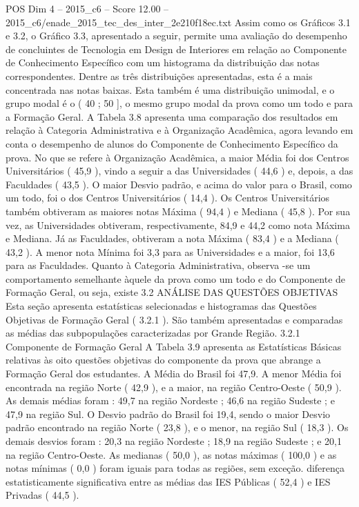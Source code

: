 \begin{textsample}{POS Dim 4 – 2015\_c6 – Score 12.00 – 2015\_c6/enade\_2015\_tec\_des\_inter\_2e210f18ec.txt}
Assim como os Gráficos 3.1 e 3.2, o Gráfico 3.3, apresentado a seguir, permite uma avaliação do desempenho de concluintes de Tecnologia em Design de Interiores em relação ao Componente de Conhecimento Específico com um histograma da distribuição das notas correspondentes.
Dentre as três distribuições apresentadas, esta é a mais concentrada nas notas baixas.
Esta também é uma distribuição unimodal, e o grupo modal é o ( 40 ; 50 ], o mesmo grupo modal da prova como um todo e para a Formação Geral.
A Tabela 3.8 apresenta uma comparação dos resultados em relação à Categoria Administrativa e à Organização Acadêmica, agora levando em conta o desempenho de alunos do Componente de Conhecimento Específico da prova.
No que se refere à Organização Acadêmica, a maior Média foi dos Centros Universitários ( 45,9 ), vindo a seguir a das Universidades ( 44,6 ) e, depois, a das Faculdades ( 43,5 ).
O maior Desvio padrão, e acima do valor para o Brasil, como um todo, foi o dos Centros Universitários ( 14,4 ).
Os Centros Universitários também obtiveram as maiores notas Máxima ( 94,4 ) e Mediana ( 45,8 ).
Por sua vez, as Universidades obtiveram, respectivamente, 84,9 e 44,2 como nota Máxima e Mediana.
Já as Faculdades, obtiveram a nota Máxima ( 83,4 ) e a Mediana ( 43,2 ).
A menor nota Mínima foi 3,3 para as Universidades e a maior, foi 13,6 para as Faculdades.
Quanto à Categoria Administrativa, observa -se um comportamento semelhante àquele da prova como um todo e do Componente de Formação Geral, ou seja, existe 3.2 ANÁLISE DAS QUESTÕES OBJETIVAS Esta seção apresenta estatísticas selecionadas e histogramas das Questões Objetivas de Formação Geral ( 3.2.1 ).
São também apresentadas e comparadas as médias das subpopulações caracterizadas por Grande Região. 3.2.1 Componente de Formação Geral A Tabela 3.9 apresenta as Estatísticas Básicas relativas às oito questões objetivas do componente da prova que abrange a Formação Geral dos estudantes.
A Média do Brasil foi 47,9.
A menor Média foi encontrada na região Norte ( 42,9 ), e a maior, na região Centro-Oeste ( 50,9 ).
As demais médias foram : 49,7 na região Nordeste ; 46,6 na região Sudeste ; e 47,9 na região Sul.
O Desvio padrão do Brasil foi 19,4, sendo o maior Desvio padrão encontrado na região Norte ( 23,8 ), e o menor, na região Sul ( 18,3 ).
Os demais desvios foram : 20,3 na região Nordeste ; 18,9 na região Sudeste ; e 20,1 na região Centro-Oeste.
As medianas ( 50,0 ), as notas máximas ( 100,0 ) e as notas mínimas ( 0,0 ) foram iguais para todas as regiões, sem exceção. diferença estatisticamente significativa entre as médias das IES Públicas ( 52,4 ) e IES Privadas ( 44,5 ).

\end{textsample}
